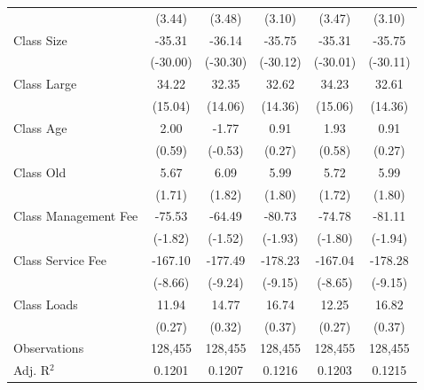 {\begin{tabular}{l*{5}{c}}
                    &      (3.44)         &      (3.48)         &      (3.10)         &      (3.47)         &      (3.10)         \\
\addlinespace
Class Size          &      -35.31\sym{***}&      -36.14\sym{***}&      -35.75\sym{***}&      -35.31\sym{***}&      -35.75\sym{***}\\
                    &    (-30.00)         &    (-30.30)         &    (-30.12)         &    (-30.01)         &    (-30.11)         \\
\addlinespace
Class Large         &       34.22\sym{***}&       32.35\sym{***}&       32.62\sym{***}&       34.23\sym{***}&       32.61\sym{***}\\
                    &     (15.04)         &     (14.06)         &     (14.36)         &     (15.06)         &     (14.36)         \\
\addlinespace
Class Age           &        2.00         &       -1.77         &        0.91         &        1.93         &        0.91         \\
                    &      (0.59)         &     (-0.53)         &      (0.27)         &      (0.58)         &      (0.27)         \\
\addlinespace
Class Old           &        5.67\sym{*}  &        6.09\sym{*}  &        5.99\sym{*}  &        5.72\sym{*}  &        5.99\sym{*}  \\
                    &      (1.71)         &      (1.82)         &      (1.80)         &      (1.72)         &      (1.80)         \\
\addlinespace
Class Management Fee&      -75.53\sym{*}  &      -64.49         &      -80.73\sym{*}  &      -74.78\sym{*}  &      -81.11\sym{*}  \\
                    &     (-1.82)         &     (-1.52)         &     (-1.93)         &     (-1.80)         &     (-1.94)         \\
\addlinespace
Class Service Fee   &     -167.10\sym{***}&     -177.49\sym{***}&     -178.23\sym{***}&     -167.04\sym{***}&     -178.28\sym{***}\\
                    &     (-8.66)         &     (-9.24)         &     (-9.15)         &     (-8.65)         &     (-9.15)         \\
\addlinespace
Class Loads         &       11.94         &       14.77         &       16.74         &       12.25         &       16.82         \\
                    &      (0.27)         &      (0.32)         &      (0.37)         &      (0.27)         &      (0.37)         \\
\midrule
Observations        &     128,455         &     128,455         &     128,455         &     128,455         &     128,455         \\
Adj. R$^{2}$        &      0.1201         &      0.1207         &      0.1216         &      0.1203         &      0.1215         \\
\bottomrule
\end{tabular}
}
